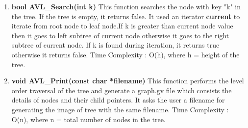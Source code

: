 \documentclass[12pt]{article}
\begin{document}
\begin{enumerate}
\begin{enumerate} [label=\roman*]
\begin{enumerate} [label=\roman*]
                If a = 1, then RL rotation is performed. \newline
            \end{enumerate}
    \end{enumerate}
    Time Complexity : O(h), where h = height of the tree.
    \item \textbf{bool AVL\_Search(int k)}\newline
    This function searches the node with key "k" in the tree. If the tree is empty, it returns false. It used an iterator \textbf{current} to iterate from root node to leaf node.If k is greater than current node value then it goes to left subtree of current node otherwise it goes to the right subtree of current node. If k is found during iteration, it returns true otherwise it returns false.\newline\newline
    Time Complexity : O(h), where h = height of the tree.
    \item \textbf{void AVL\_Print(const char *filename)} \newline
    This function performs the level order traversal of the tree and generate a graph.gv file which consists the details of nodes and their child pointers. It asks the user a filename for generating the image of tree with the same filename.\newline \newline
    Time Complexity : O(n), where n = total number of nodes in the tree.
\end{enumerate}
\end{document}

